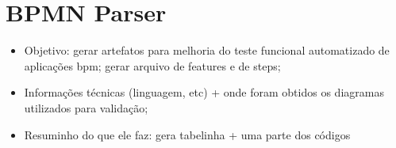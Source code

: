 \documentclass[12pt]{article}
\begin{document}

\section{BPMN Parser}
\begin{itemize}
\item Objetivo: gerar artefatos para melhoria do teste funcional automatizado de aplicações bpm; gerar arquivo de features e de steps;
\item Informações técnicas (linguagem, etc) + onde foram obtidos os diagramas utilizados para validação;
\item Resuminho do que ele faz: gera tabelinha + uma parte dos códigos
\end{itemize}

\end{document}

